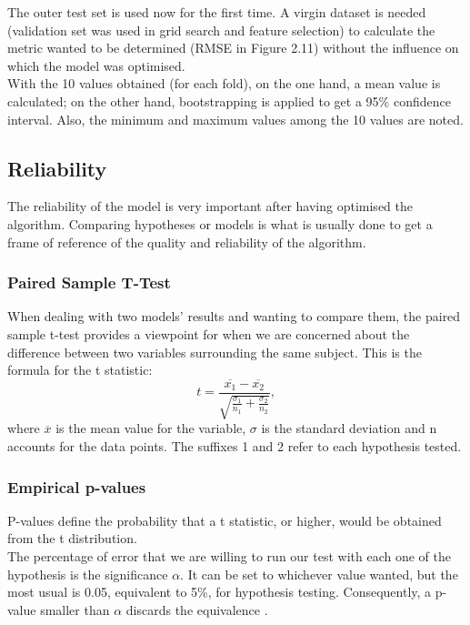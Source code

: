 The outer test set is used now for the first time. A virgin dataset is needed (validation set was used in grid search and feature selection) to calculate the metric wanted to be determined (RMSE in Figure 2.11) without the influence on which the model was optimised.\\

 With the 10 values obtained (for each fold), on the one hand, a mean value is calculated; on the other hand, bootstrapping is applied to get a 95\% confidence interval. Also, the minimum and maximum values among the 10 values are noted.

\subsection{Reliability}
The reliability of the model is very important after having optimised the algorithm. Comparing hypotheses or models is what is usually done to get a frame of reference of the quality and reliability of the algorithm.   
\subsubsection{Paired Sample T-Test} 
When dealing with two models' results and wanting to compare them, the paired sample t-test provides a viewpoint for when we are concerned about the difference between two variables surrounding the same subject.
This is the formula for the t statistic:
\begin{equation}
    t=\frac{\overline{x_1}-\overline{x_2}}{\sqrt{\frac{\sigma_1}{n_1}+\frac{\sigma_2}{n_2}}},
\end{equation}
where $\overline{x}$ is the mean value for the variable, $\sigma$ is the standard deviation and n accounts for the data points. The suffixes 1 and 2 refer to each hypothesis tested.
\subsubsection{Empirical p-values}
P-values define the probability that a t statistic, or higher, would be obtained from the t distribution.\\

The percentage of error that we are willing to run our test with each one of the hypothesis is the significance $\alpha$. It can be set to whichever value wanted, but the most usual is 0.05, equivalent to 5\%, for hypothesis testing. Consequently, a p-value smaller than $\alpha$ discards the equivalence \cite{pvalue}. 
 

 












